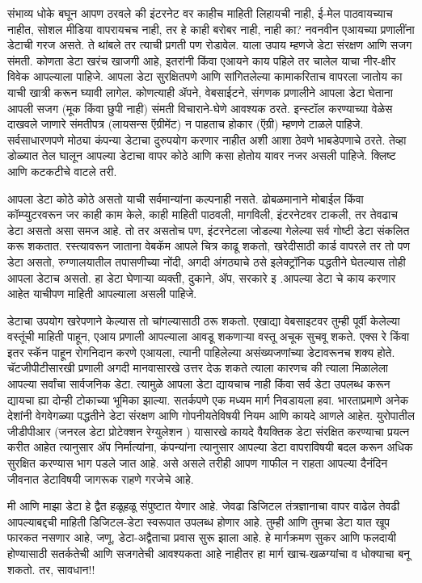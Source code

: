 संभाव्य धोके बघून आपण ठरवले की इंटरनेट वर काहीच माहिती लिहायची नाही, ई-मेल पाठवायच्याच नाहीत, सोशल मीडिया वापरायचच नाही, तर हे काही बरोबर नाही, नाही का? नवनवीन एआयच्या प्रणालींना डेटाची गरज असते. ते थांबले तर त्याची प्रगती पण रोडावेल. याला उपाय म्हणजे डेटा संरक्षण आणि सजग संमती. कोणता डेटा खरंच खाजगी आहे,  इतरांनी किंवा एआयने काय पहिले तर चालेल याचा नीर-क्षीर विवेक आपल्याला पाहिजे. आपला डेटा सुरक्षितपणे आणि सांगितलेल्या कामाकरिताच वापरला जातोय का याची खात्री करून घ्यावी लागेल. कोणत्याही ॲपने, वेबसाईटने, संगणक प्रणालीने आपला डेटा घेताना आपली सजग (मूक किंवा छुपी नाही) संमती विचाराने-घेणे आवश्यक ठरते. इन्स्टॉल करण्याच्या वेळेस दाखवले जाणारे संमतीपत्र (लायसन्स ऍग्रीमेंट) न पाहताच होकार (ऍग्री) म्हणणे टाळले पाहिजे. सर्वसाधारणपणे मोठ्या कंपन्या डेटाचा दुरुपयोग करणार नाहीत अशी आशा ठेवणे भाबडेपणाचे ठरते. तेव्हा डोळ्यात तेल घालून आपल्या डेटाचा वापर कोठे आणि कसा होतोय यावर नजर असली पाहिजे. क्लिष्ट आणि कटकटीचे वाटले तरी.

आपला डेटा कोठे कोठे असतो याची सर्वमान्यांना कल्पनाही नसते. ढोबळमानाने मोबाईल किंवा कॉम्प्युटरवरून जर काही काम केले, काही माहिती पाठवली, मागविली, इंटरनेटवर टाकली, तर तेवढाच डेटा असतो असा समज आहे. तो तर असतोच पण, इंटरनेटला जोडल्या गेलेल्या सर्व गोष्टी डेटा संकलित करू शकतात. रस्त्यावरून जाताना वेबकॅम आपले चित्र काढू शकतो, खरेदीसाठी कार्ड वापरले तर तो पण डेटा असतो, रुग्णालयातील तपासणीच्या नोंदी, अगदी अंगठ्याचे ठसे इलेक्ट्रॉनिक पद्धतीने घेतल्यास तोही आपला डेटाच असतो. हा डेटा घेणाऱ्या व्यक्ती, दुकाने, ॲप, सरकारे इ .आपल्या डेटा चे काय करणार आहेत याचीपण माहिती आपल्याला असली पाहिजे.

डेटाचा उपयोग खरेपणाने केल्यास तो चांगल्यासाठी ठरू शकतो. एखाद्या वेबसाइटवर तुम्ही पूर्वी केलेल्या वस्तूंची माहिती पाहून, एआय प्रणाली आपल्याला आवडू शकणाऱ्या वस्तू अचूक सुचवू शकते. एक्स रे किंवा इतर स्कॅन पाहून रोगनिदान करणे एआयला, त्यानी पाहिलेल्या असंख्यजणांच्या डेटावरूनच शक्य होते. चॅटजीपीटीसारखी प्रणाली अगदी मानवासारखे उत्तर देऊ शकते त्याला कारणच की त्याला मिळालेला आपल्या सर्वांचा सार्वजनिक डेटा. त्यामुळे आपला डेटा द्यायचाच नाही किंवा सर्व डेटा उपलब्ध करून द्यायचा ह्या दोन्ही टोकाच्या भूमिका झाल्या. सतर्कपणे एक मध्यम मार्ग निवडायला हवा. भारताप्रमाणे अनेक देशांनी वेगवेगळ्या पद्धतीने डेटा संरक्षण आणि गोपनीयतेविषयी नियम आणि कायदे आणले आहेत. युरोपातील जीडीपीआर (जनरल डेटा प्रोटेक्शन रेग्युलेशन ) यासारखे कायदे वैयक्तिक डेटा संरक्षित करण्याचा प्रयत्न करीत आहेत त्यानुसार ॲप निर्मात्यांना, कंपन्यांना त्यानुसार आपल्या डेटा वापराविषयी बदल करून अधिक सुरक्षित करण्यास भाग पडले जात आहे. असे असले तरीही आपण गाफील न राहता आपल्या दैनंदिन जीवनात डेटाविषयी जागरूक राहणे गरजेचे आहे.

मी आणि माझा डेटा हे द्वैत हळूहळू संपुष्टात येणार आहे. जेवढा डिजिटल तंत्रज्ञानाचा वापर वाढेल तेवढी आपल्याबद्दची माहिती डिजिटल-डेटा स्वरूपात उपलब्ध होणार आहे. तुम्ही आणि तुमचा डेटा यात खूप फारकत नसणार आहे, जणू, डेटा-अद्वैताचा प्रवास सुरू झाला आहे. हे मार्गक्रमण सुकर आणि फलदायी होण्यासाठी सतर्कतेची आणि सजगतेची आवश्यकता आहे नाहीतर हा मार्ग खाच-खळग्यांचा व धोक्याचा बनू शकतो. तर, सावधान!!